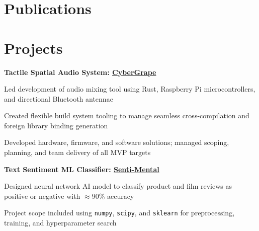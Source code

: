 \documentclass[10pt]{article}
\newenvironment{mylist}[1][]
{\itemize[nosep, wide=0pt, leftmargin=*, after=\strut]}
{\enditemize}
\begin{document}

\section{Publications}

\begin{refsection}
\nocite{*}
\printbibliography[heading=none]
\end{refsection}



\section{Projects}

\begin{minipage}[t]{\linewidth}
    \textbf{Tactile Spatial Audio System: \href{https://sgilfeather.github.io/CyberGrape/cybergrape/index.html}{CyberGrape}}
    \begin{mylist}
        \item Led development of audio mixing tool using Rust, Raspberry Pi microcontrollers, and directional Bluetooth antennae
        \item Created flexible build system tooling to manage seamless cross-compilation and foreign library binding generation
        \item Developed hardware, firmware, and software solutions; managed scoping, planning, and team delivery of all MVP targets
    \end{mylist}
\end{minipage}

\begin{minipage}[t]{\linewidth}
    \textbf{Text Sentiment ML Classifier: \href{https://github.com/liam-strand/cs135-projA}{Senti-Mental}}
    \begin{mylist}
        \item Designed neural network AI model to classify product and film reviews as positive or negative with $\approx$90\% accuracy
        \item Project scope included using \texttt{numpy}, \texttt{scipy}, and \texttt{sklearn} for preprocessing, training, and hyperparameter search
    \end{mylist}
\end{minipage}
\end{document}
